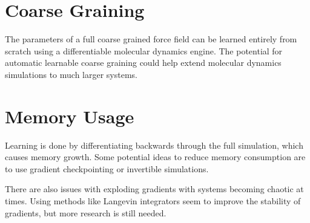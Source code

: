 \documentclass[book.tex]{subfiles}
\begin{document}

\section{Coarse Graining}

The parameters of a full coarse grained force field can be learned entirely from scratch using a differentiable molecular dynamics engine. The potential for automatic learnable coarse graining could help extend molecular dynamics simulations to much larger systems.

\section{Memory Usage}

Learning is done by differentiating backwards through the full simulation, which causes memory growth. Some potential ideas to reduce memory consumption are to use gradient checkpointing or invertible simulations.


There are also issues with exploding gradients with systems becoming chaotic at times. Using methods like Langevin integrators seem to improve the stability of gradients, but more research is still needed. %



\end{document}
